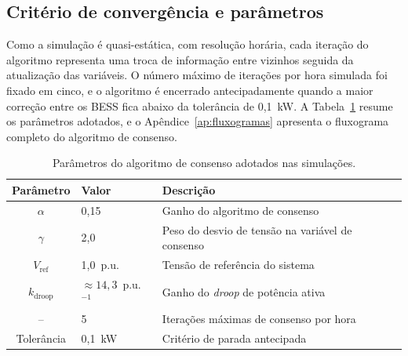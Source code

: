 \subsection{Critério de convergência e parâmetros}
\label{sec:convergencia}

Como a simulação é quasi-estática, com resolução horária, cada iteração do algoritmo representa uma troca de informação entre vizinhos seguida da atualização das variáveis. O número máximo de iterações por hora simulada foi fixado em cinco, e o algoritmo é encerrado antecipadamente quando a maior correção entre os BESS fica abaixo da tolerância de 0,1~kW. A Tabela~\ref{tab:parametros_consenso} resume os parâmetros adotados, e o Apêndice~\ref{ap:fluxogramas} apresenta o fluxograma completo do algoritmo de consenso.

\begin{table}[!htb]
  \centering
  \caption{Parâmetros do algoritmo de consenso adotados nas simulações.}
  \label{tab:parametros_consenso}
  \begin{tabular}{@{}cll@{}}
    \toprule
    \textbf{Parâmetro} & \textbf{Valor} & \textbf{Descrição} \\
    \midrule
    $\alpha$       & 0,15 & Ganho do algoritmo de consenso \\
    $\gamma$       & 2,0  & Peso do desvio de tensão na variável de consenso \\
    $V_\text{ref}$ & 1,0~p.u. & Tensão de referência do sistema \\
    $k_\text{droop}$ & $\approx 14{,}3$~p.u.$^{-1}$ & Ganho do \emph{droop} de potência ativa \\
    --             & 5    & Iterações máximas de consenso por hora \\
    Tolerância     & 0,1~kW & Critério de parada antecipada \\
    \bottomrule
  \end{tabular}
  \par\vspace{2pt}
\end{table}
